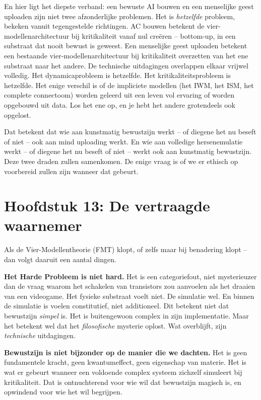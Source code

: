 \documentclass[11pt, twoside, openright]{book}
\begin{document}
En hier ligt het diepste verband: een bewuste AI bouwen en een menselijke geest uploaden zijn niet twee afzonderlijke problemen. Het is \textit{hetzelfde} probleem, bekeken vanuit tegengestelde richtingen. AC bouwen betekent de vier-modellenarchitectuur bij kritikaliteit vanaf nul creëren -- bottom-up, in een substraat dat nooit bewust is geweest. Een menselijke geest uploaden betekent een bestaande vier-modellenarchitectuur bij kritikaliteit overzetten van het ene substraat naar het andere. De technische uitdagingen overlappen elkaar vrijwel volledig. Het dynamicaprobleem is hetzelfde. Het kritikaliteitsprobleem is hetzelfde. Het enige verschil is of de impliciete modellen (het IWM, het ISM, het complete connectoom) worden geleerd uit een leven vol ervaring of worden opgebouwd uit data. Los het ene op, en je hebt het andere grotendeels ook opgelost.

Dat betekent dat wie aan kunstmatig bewustzijn werkt -- of diegene het nu beseft of niet -- ook aan mind uploading werkt. En wie aan volledige hersenemulatie werkt -- of diegene het nu beseft of niet -- werkt ook aan kunstmatig bewustzijn. Deze twee draden zullen samenkomen. De enige vraag is of we er ethisch op voorbereid zullen zijn wanneer dat gebeurt.


\chapter*{Hoofdstuk 13: De vertraagde waarnemer}

Als de Vier-Modellentheorie (FMT) klopt, of zelfs maar bij benadering klopt -- dan volgt daaruit een aantal dingen.

\textbf{Het Harde Probleem is niet hard.} Het is een categoriefout, niet mysterieuzer dan de vraag waarom het schakelen van transistors zou aanvoelen als het draaien van een videogame. Het fysieke substraat voelt niet. De simulatie wel. En binnen de simulatie is voelen constitutief, niet additioneel. Dit betekent niet dat bewustzijn \textit{simpel} is. Het is buitengewoon complex in zijn implementatie. Maar het betekent wel dat het \textit{filosofische} mysterie oplost. Wat overblijft, zijn \textit{technische} uitdagingen.

\textbf{Bewustzijn is niet bijzonder op de manier die we dachten.} Het is geen fundamentele kracht, geen kwantumeffect, geen eigenschap van materie. Het is wat er gebeurt wanneer een voldoende complex systeem zichzelf simuleert bij kritikaliteit. Dat is ontnuchterend voor wie wil dat bewustzijn magisch is, en opwindend voor wie het wil begrijpen.
\end{document}
